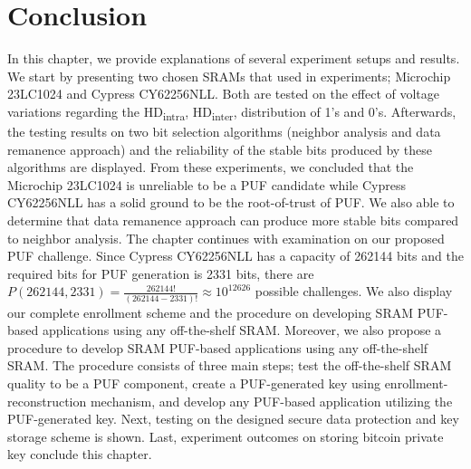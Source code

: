 \section{Conclusion}
In this chapter, we provide explanations of several experiment setups and results. We start by presenting two chosen SRAMs that used in experiments; Microchip 23LC1024 and Cypress CY62256NLL. Both are tested on the effect of voltage variations regarding the HD\textsubscript{intra}, HD\textsubscript{inter}, distribution of 1's and 0's. Afterwards, the testing results on two bit selection algorithms (neighbor analysis and data remanence approach) and the reliability of the stable bits produced by these algorithms are displayed. From these experiments, we concluded that the Microchip 23LC1024 is unreliable to be a PUF candidate while Cypress CY62256NLL has a solid ground to be the root-of-trust of PUF. We also able to determine that data remanence approach can produce more stable bits compared to neighbor analysis.
The chapter continues with examination on our proposed PUF challenge. Since Cypress CY62256NLL has a capacity of 262144 bits and the required bits for PUF generation is 2331 bits, there are $P(262144, 2331)=\frac{262144!}{\left( 262144-2331 \right) !}\approx 10^{12626}$ possible challenges. We also display our complete enrollment scheme and the procedure on developing SRAM PUF-based applications using any off-the-shelf SRAM.
Moreover, we also propose a procedure to develop SRAM PUF-based applications using any off-the-shelf SRAM. The procedure consists of three main steps; test the off-the-shelf SRAM quality to be a PUF component, create a PUF-generated key using enrollment-reconstruction mechanism, and develop any PUF-based application utilizing the PUF-generated key.
Next, testing on the designed secure data protection and key storage scheme is shown. Last, experiment outcomes on storing bitcoin private key conclude this chapter.
